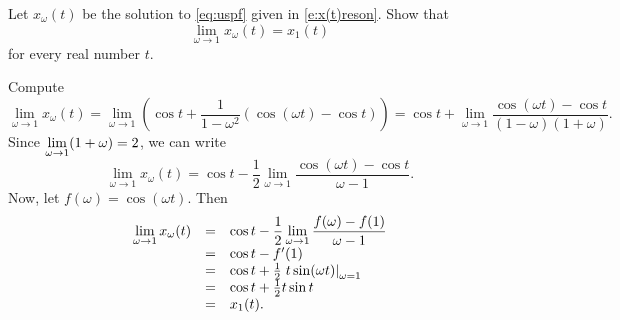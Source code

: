 \documentclass{ximera}
\begin{document}
\begin{exercise} \label{c12.5.3}
Let $x_\omega(t)$ be the solution to \eqref{eq:uspf} given in 
\eqref{e:x(t)reson}.  Show that 
\[
\lim_{\omega\to 1}x_\omega(t) = x_1(t)
\]
for every real number $t$.

\begin{solution}

Compute
\[
\lim_{\omega \rightarrow 1} x_\omega(t) =
\lim_{\omega \rightarrow 1}\left(\cos t + \frac{1}{1 - \omega^2}
(\cos(\omega t) - \cos t)\right) =
\cos t + \lim_{\omega \rightarrow 1}\frac{\cos(\omega t) - \cos t}
{(1 - \omega)(1 + \omega)}.
\]
Since $\displaystyle \lim_{\omega \rightarrow 1}(1 + \omega) = 2$, we can write
\[
\lim_{\omega \rightarrow 1} x_\omega(t) =
\cos t - \frac{1}{2}\lim_{\omega \rightarrow 1}
\frac{\cos(\omega t) - \cos t}{\omega - 1}.
\]
Now, let $f(\omega) = \cos(\omega t)$.  Then
\[
\begin{array}{rcl}
\displaystyle \lim_{\omega \rightarrow 1} x_\omega(t) & = &
\cos t - \displaystyle \frac{1}{2}\lim_{\omega \rightarrow 1}
\frac{f(\omega) - f(1)}{\omega - 1} \\
& = & \cos t - f'(1) \\
& = & \cos t + \frac{1}{2}\left.t\sin(\omega t)\right|_{\omega = 1} \\
& = & \cos t + \frac{1}{2}t\sin t \\
& = & x_1(t).
\end{array}
\]

\end{solution}
\end{exercise} 
\end{document}
